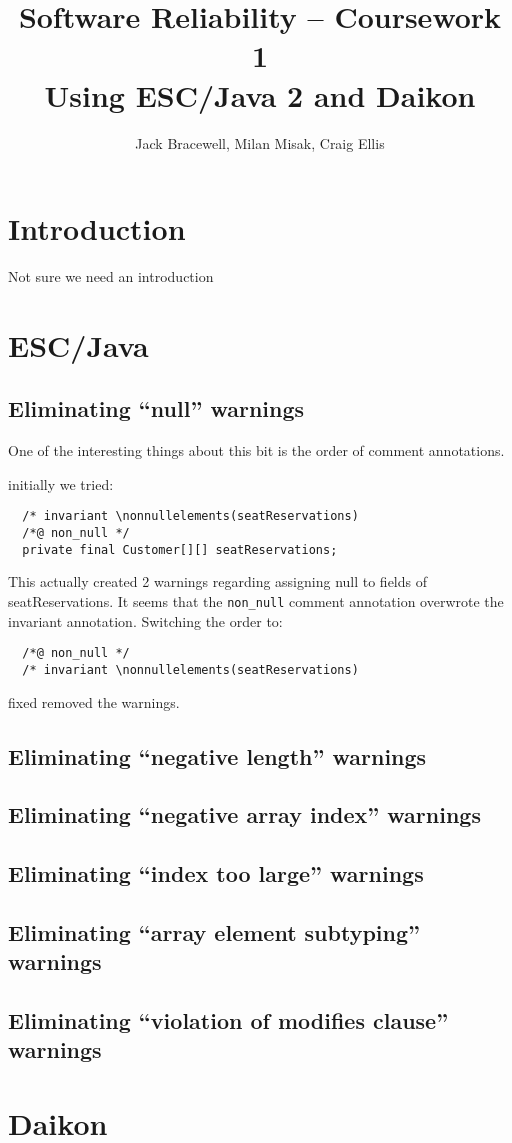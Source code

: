\documentclass{article}
\title{Software Reliability -- Coursework 1 \\ Using ESC/Java 2 and Daikon}
\author{Jack Bracewell, Milan Misak, Craig Ellis}
\date{}
\begin{document}
\maketitle

\section{Introduction}

Not sure we need an introduction

\section{ESC/Java}

\subsection{Eliminating ``null'' warnings}

One of the interesting things about this bit is the order of comment annotations.

initially we tried:

\begin{verbatim}
  /* invariant \nonnullelements(seatReservations)
  /*@ non_null */
  private final Customer[][] seatReservations;
\end{verbatim}

This actually created 2 warnings regarding assigning null to fields of seatReservations. It seems that the
\verb|non_null| comment annotation overwrote the invariant annotation. Switching the order to:
\begin{verbatim}
  /*@ non_null */
  /* invariant \nonnullelements(seatReservations)
\end{verbatim}
fixed removed the warnings.

\subsection{Eliminating ``negative length'' warnings}

\subsection{Eliminating ``negative array index'' warnings}

\subsection{Eliminating ``index too large'' warnings}

\subsection{Eliminating ``array element subtyping'' warnings}

\subsection{Eliminating ``violation of modifies clause'' warnings}

\section{Daikon}
\end{document}
